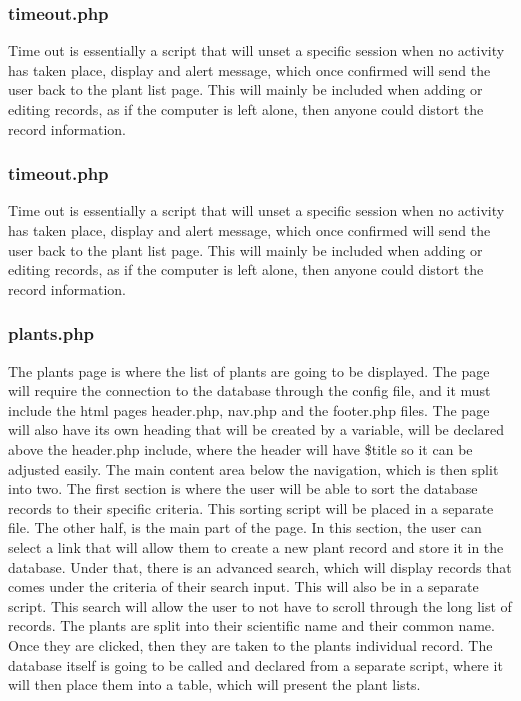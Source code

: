 	\subsubsection{timeout.php}
		Time out is essentially a script that will unset a specific session when no activity has taken place, display and alert message, which once confirmed will send the user back to the plant list page. This will mainly be included when adding or editing records, as if the computer is left alone, then anyone could distort the record information.

	\subsubsection{timeout.php}
		Time out is essentially a script that will unset a specific session when no activity has taken place, display and alert message, which once confirmed will send the user back to the plant list page. This will mainly be included when adding or editing records, as if the computer is left alone, then anyone could distort the record information.

	\subsubsection{plants.php}
		The plants page is where the list of plants are going to be displayed. The page will require the connection to the database through the config file, and it must include the html pages header.php, nav.php and the footer.php files.  The page will also have its own heading that will be created by a variable, will be declared above the header.php include, where the header will have \$title so it can be adjusted easily. The main content area below the navigation, which is then split into two. The first section is where the user will be able to sort the database records to their specific criteria. This sorting script will be placed in a separate file. The other half, is the main part of the page. In this section, the user can select a link that will allow them to create a new plant record and store it in the database. Under that, there is an advanced search, which will display records that comes under the criteria of their search input. This will also be in a separate script. This search will allow the user to not have to scroll through the long list of records. The plants are split into their scientific name and their common name. Once they are clicked, then they are taken to the plants individual record. The database itself is going to be called and declared from a separate script, where it will then place them into a table, which will present the plant lists.

